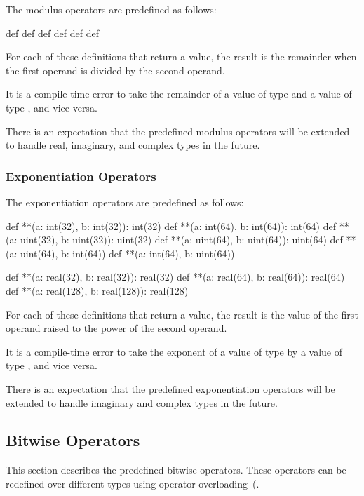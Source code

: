 The modulus operators are predefined as follows:
\begin{chapel}
def %
def %
def %
def %
def %
def %
\end{chapel}
For each of these definitions that return a value, the result is the
remainder when the first operand is divided by the second operand.

It is a compile-time error to take the remainder of a value of
type  and a value of type , and vice
versa.

There is an expectation that the predefined modulus operators will be
extended to handle real, imaginary, and complex types in the future.

\subsubsection{Exponentiation Operators}
\label{Exponentiation_Operators}

The exponentiation operators are predefined as follows:
\begin{chapel}
def **(a: int(32), b: int(32)): int(32)
def **(a: int(64), b: int(64)): int(64)
def **(a: uint(32), b: uint(32)): uint(32)
def **(a: uint(64), b: uint(64)): uint(64)
def **(a: uint(64), b: int(64))
def **(a: int(64), b: uint(64))

def **(a: real(32), b: real(32)): real(32)
def **(a: real(64), b: real(64)): real(64)
def **(a: real(128), b: real(128)): real(128)
\end{chapel}
For each of these definitions that return a value, the result is the
value of the first operand raised to the power of the second operand.

It is a compile-time error to take the exponent of a value of
type  by a value of type , and vice
versa.

There is an expectation that the predefined exponentiation operators
will be extended to handle imaginary and complex types in the future.

\subsection{Bitwise Operators}
\label{Bitwise_Operators}

This section describes the predefined bitwise operators.  These
operators can be redefined over different types using operator
overloading~(.

